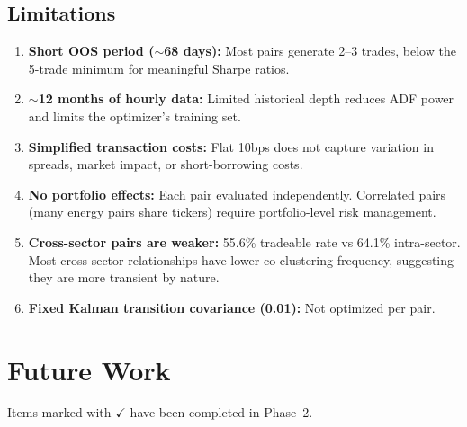 \documentclass[11pt, a4paper]{article}
\begin{document}
\subsection{Limitations}

\begin{enumerate}
    \item \textbf{Short OOS period ($\sim$68 days):} Most pairs generate 2--3 trades, below the 5-trade minimum for meaningful Sharpe ratios.
    \item \textbf{$\sim$12 months of hourly data:} Limited historical depth reduces ADF power and limits the optimizer's training set.
    \item \textbf{Simplified transaction costs:} Flat 10bps does not capture variation in spreads, market impact, or short-borrowing costs.
    \item \textbf{No portfolio effects:} Each pair evaluated independently. Correlated pairs (many energy pairs share tickers) require portfolio-level risk management.
    \item \textbf{Cross-sector pairs are weaker:} 55.6\% tradeable rate vs 64.1\% intra-sector. Most cross-sector relationships have lower co-clustering frequency, suggesting they are more transient by nature.
    \item \textbf{Fixed Kalman transition covariance (0.01):} Not optimized per pair.
\end{enumerate}

\section{Future Work}

Items marked with $\checkmark$ have been completed in Phase~2.
\end{document}
